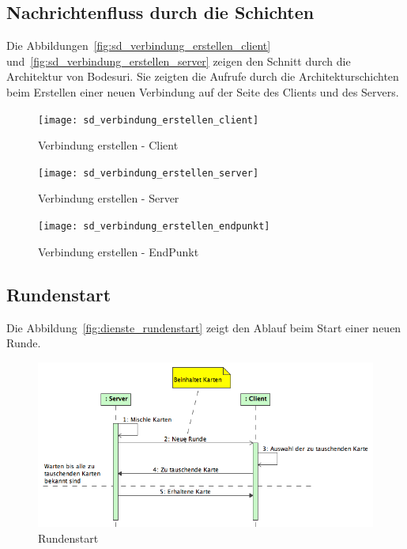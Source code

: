 \documentclass[12pt,halfparskip]{scrartcl}
\begin{document}
\subsection{Nachrichtenfluss durch die Schichten} %
\label{sub:nachrichtenfluss_durch_die_schichten}
Die Abbildungen~\vref{fig:sd_verbindung_erstellen_client} und~\vref{fig:sd_verbindung_erstellen_server} zeigen den Schnitt durch die Architektur von Bodesuri. Sie zeigten die Aufrufe durch die Architekturschichten beim Erstellen einer neuen Verbindung auf der Seite des Clients und des Servers.
\begin{figure}[h]
	\centering
	\texttt{[image: sd\_verbindung\_erstellen\_client]}
	\caption{Verbindung erstellen - Client}
	\label{fig:sd_verbindung_erstellen_client}
\end{figure}
\begin{figure}[h]
	\centering
	\texttt{[image: sd\_verbindung\_erstellen\_server]}
	\caption{Verbindung erstellen - Server}
	\label{fig:sd_verbindung_erstellen_server}
\end{figure}

\begin{figure}[h]
	\centering
	\texttt{[image: sd\_verbindung\_erstellen\_endpunkt]}
	\caption{Verbindung erstellen - EndPunkt}
	\label{fig:sd_verbindung_erstellen_endpunkt}
\end{figure}


\subsection{Rundenstart} %
\label{sub:rundenstart}
Die Abbildung~\vref{fig:dienste_rundenstart} zeigt den Ablauf beim Start einer neuen Runde.
\begin{figure}[h]
	\centering
	\includegraphics[width=0.7 \textwidth]{dienste_rundenstart}
	\caption{Rundenstart}
	\label{fig:dienste_rundenstart}
\end{figure}
\end{document}
